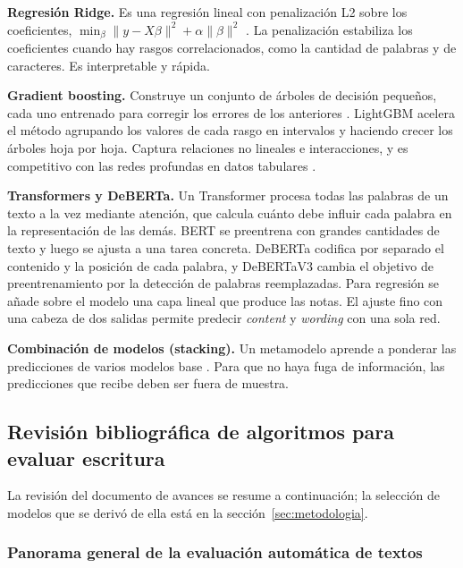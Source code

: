 \documentclass[11pt,a4paper]{article}
\begin{document}
\textbf{Regresión Ridge.} Es una regresión lineal con penalización L2 sobre los coeficientes, $\min_\beta \lVert y - X\beta\rVert^2 + \alpha\lVert\beta\rVert^2$ \citep{hoerl1970}. La penalización estabiliza los coeficientes cuando hay rasgos correlacionados, como la cantidad de palabras y de caracteres. Es interpretable y rápida.

\textbf{Gradient boosting.} Construye un conjunto de árboles de decisión pequeños, cada uno entrenado para corregir los errores de los anteriores \citep{friedman2001}. LightGBM \citep{ke2017} acelera el método agrupando los valores de cada rasgo en intervalos y haciendo crecer los árboles hoja por hoja. Captura relaciones no lineales e interacciones, y es competitivo con las redes profundas en datos tabulares \citep{shwartz2022}.

\textbf{Transformers y DeBERTa.} Un Transformer procesa todas las palabras de un texto a la vez mediante atención, que calcula cuánto debe influir cada palabra en la representación de las demás. BERT \citep{devlin2019} se preentrena con grandes cantidades de texto y luego se ajusta a una tarea concreta. DeBERTa \citep{he2021} codifica por separado el contenido y la posición de cada palabra, y DeBERTaV3 \citep{he2023} cambia el objetivo de preentrenamiento por la detección de palabras reemplazadas. Para regresión se añade sobre el modelo una capa lineal que produce las notas. El ajuste fino con una cabeza de dos salidas permite predecir \emph{content} y \emph{wording} con una sola red.

\textbf{Combinación de modelos (stacking).} Un metamodelo aprende a ponderar las predicciones de varios modelos base \citep{wolpert1992}. Para que no haya fuga de información, las predicciones que recibe deben ser fuera de muestra.


\subsection{Revisión bibliográfica de algoritmos para evaluar escritura}

La revisión del documento de avances se resume a continuación; la selección de modelos que se derivó de ella está en la sección~\ref{sec:metodologia}.

\subsubsection{Panorama general de la evaluación automática de textos}
\end{document}

